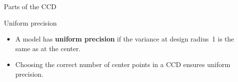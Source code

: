 \documentclass[10pt]{beamer}
\begin{document}
\begin{frame}{Parts of the CCD}
\begin{itemize}[<+->]
\end{itemize}
\end{frame}

\begin{frame}{Uniform precision}

\begin{itemize}
	\item A model has \textbf{uniform precision} if the variance at design radius~1 is the same as at the center.
\end{itemize}


\begin{itemize}
	\item<3-> Choosing the correct number of center points in a CCD ensures uniform precision.
\end{itemize}
	
\end{frame}
\end{document}
